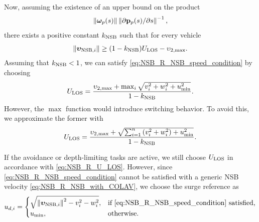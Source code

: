 Now, assuming the existence of an upper bound on the product $$\left\|\bm{\omega}_p(s)\right\|\left\|\partial \mathbf{p}_p(s) / \partial s\right\|^{-1},$$ there exists a positive constant $k_{\rm NSB}$ such that for every vehicle 
\begin{equation}
    \left\|\bm{\upsilon}_{{\rm NSB}, i}\right\| \geq (1 - k_{\rm NSB})U_{\rm LOS} - \upsilon_{2, \max}.
\end{equation}
Assuming that $k_{\rm NSB} < 1$, we can satisfy \eqref{eq:NSB_R_NSB_speed_condition} by choosing 
\begin{equation}
    U_{\rm LOS} = \frac{\upsilon_{2, \max} + \max_i \sqrt{v_i^2 + w_i^2 + u_{\min}^2}}{1 - k_{\rm NSB}}.
\end{equation}
However, the $\max$ function would introduce switching behavior.
To avoid this, we approximate the former with 
\begin{equation}
    U_{\rm LOS} = \frac{\upsilon_{2, \max} + \sqrt{\sum_{i=1}^n \left(v_i^2 + w_i^2\right) + u_{\min}^2}}{1 - k_{\rm NSB}}.
    \label{eq:NSB_R_U_LOS}
\end{equation}


If the avoidance or depth-limiting tasks are active, we still choose $U_{\rm LOS}$ in accordance with \eqref{eq:NSB_R_U_LOS}.
However, since \eqref{eq:NSB_R_NSB_speed_condition} cannot be satisfied with a generic NSB velocity \eqref{eq:NSB_R_NSB_with_COLAV}, we choose the surge reference as 
\begin{equation}
    u_{d, i} = 
    \begin{cases}
        \sqrt{\left\|\bm{\upsilon}_{{\rm NSB}, i}\right\|^2 - v_i^2 - w_i^2},  &\text{if \eqref{eq:NSB_R_NSB_speed_condition} satisfied,} \\
        u_{\rm min}, &\text{otherwise}.
    \end{cases}
\end{equation}


